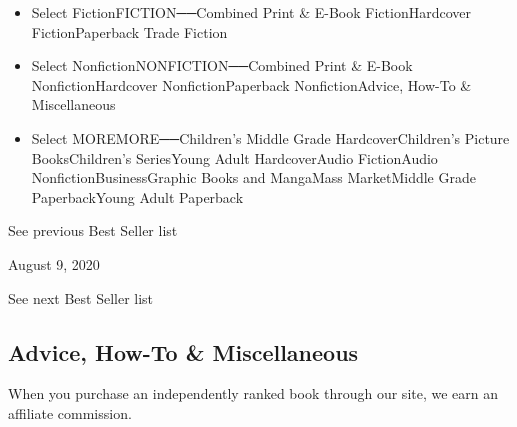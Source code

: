 \begin{itemize}
\tightlist
\item
  Select FictionFICTION──Combined Print \& E-Book FictionHardcover
  FictionPaperback Trade Fiction
\item
  Select NonfictionNONFICTION──Combined Print \& E-Book
  NonfictionHardcover NonfictionPaperback NonfictionAdvice, How-To \&
  Miscellaneous
\item
  Select MOREMORE──Children's Middle Grade HardcoverChildren's Picture
  BooksChildren's SeriesYoung Adult HardcoverAudio FictionAudio
  NonfictionBusinessGraphic Books and MangaMass MarketMiddle Grade
  PaperbackYoung Adult Paperback
\end{itemize}

\href{/books/best-sellers/2020/08/02/advice-how-to-and-miscellaneous/}{}

See previous Best Seller list

August 9, 2020

See next Best Seller list

\hypertarget{advice-how-to--miscellaneous}{%
\subsection{Advice, How-To \&
Miscellaneous}\label{advice-how-to--miscellaneous}}

When you purchase an independently ranked book through our site, we earn
an affiliate commission.

